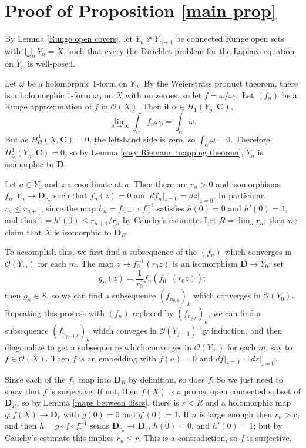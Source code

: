 \documentclass[reqno,12pt,letterpaper]{amsart}
\newcommand{\CC}{\mathbf{C}}
\newcommand{\DD}{\mathbf{D}}
\newcommand{\Olo}{\mathscr O}
\theoremstyle{definition}
\begin{document}
\section{Proof of Proposition \ref{main prop}}
By Lemma \ref{Runge open covers}, let $Y_n \Subset Y_{n+1}$ be connected Runge open sets with $\bigcup_n Y_n = X$, such that every the Dirichlet problem for the Laplace equation on $Y_n$ is well-posed.

Let $\omega$ be a holomorphic $1$-form on $Y_n$.
By the Weierstrass product theorem, there is a holomorphic $1$-form $\omega_0$ on $X$ with no zeroes, so let $f = \omega/\omega_0$.
Let $(f_n)$ be a Runge approximation of $f$ in $\Olo(X)$.
Then if $\alpha \in H_1(Y_n, \CC)$,
$$\lim_{n \to \infty} \int_\alpha f_n \omega_0 = \int_\alpha \omega.$$
But as $H^1_\Olo(X, \CC) = 0$, the left-hand side is zero, so $\int_\alpha \omega = 0$.
Therefore $H^1_\Olo(Y_n, \CC) = 0$, so by Lemma \ref{easy Riemann mapping theorem}, $Y_n$ is isomorphic to $\DD$.

Let $a \in Y_0$ and $z$ a coordinate at $a$.
Then there are $r_n > 0$ and isomorphisms $f_n: Y_n \to \DD_{r_n}$ such that $f_n(z) = 0$ and $df_n|_{z=0} = dz|_{z=0}$.
In particular, $r_n \leq r_{n+1}$, since the map $h_n = f_{n+1} \circ f_n^{-1}$ satisfies $h(0) = 0$ and $h'(0) = 1$, and thus $1 = h'(0) \leq r_{n+1}/r_n$ by Cauchy's estimate.
Let $R = \lim_n r_n$; then we claim that $X$ is isomorphic to $\DD_R$.

To accomplish this, we first find a subsequence of the $(f_n)$ which converges in $\Olo(Y_m)$ for each $m$.
The map $z \mapsto f_0^{-1}(r_0z)$ is an isomorphism $\DD \to Y_0$; set
$$g_n(z) = \frac{1}{r_0} f_n(f_0^{-1}(r_0z));$$
then $g_n \in \mathscr S$, so we can find a subsequence $(f_{n_{0,k}})_k$ which converges in $\Olo(Y_0)$.
Repeating this process with $(f_n)$ replaced by $(f_{n_{j,k}})_k$, we can find a subsequence $(f_{n_{j+1,k}})_k$ which conveges in $\Olo(Y_{j+1})$ by induction, and then diagonalize to get a subsequence which converges in $\Olo(Y_m)$ for each $m$, say to $f \in \Olo(X)$.
Then $f$ is an embedding with $f(a) = 0$ and $df|_{z = 0} = dz|_{z = 0}$.

Since each of the $f_n$ map into $\DD_R$ by definition, so does $f$.
So we just need to show that $f$ is surjective.
If not, then $f(X)$ is a proper open connected subset of $\DD_R$, so by Lemma \ref{maps between discs}, there is $r < R$ and a holomorphic map $g: f(X) \to \DD_r$ with $g(0) = 0$ and $g'(0) = 1$.
If $n$ is large enough then $r_n > r$, and then $h = g \circ f \circ f_n^{-1}$ sends $\DD_{r_n} \to \DD_r$, $h(0) = 0$, and $h'(0) = 1$; but by Cauchy's estimate this implies $r_n \leq r$.
This is a contradiction, so $f$ is surjective.




















\printbibliography
\end{document}
